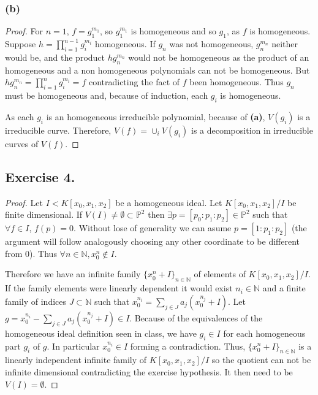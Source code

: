 \documentclass[11pt,a4paper]{article}
\begin{document}
\subsubsection*{(b)}
  \begin{proof}
    For $ n = 1 $, $ f = g_1^{m_1} $, so $ g_1^{m_1} $ is homogeneous and so $ g_1 $, as $ f $ is homogeneous. Suppose $ h = \prod_{i=1}^{n-1} g_i^{m_i} $ homogeneous. If $ g_n $ was not homogeneous, $ g_n^{m_n} $ neither would be, and the product $ h g_n^{m_n} $ would not be homogeneous as the product of an homogeneous and a non homogeneous polynomials can not be homogeneous. But $ h g_n^{m_n} = \prod_{i=1}^n g_i^{m_i} = f $ contradicting the fact of $ f $ been homogeneous. Thus $ g_n $ must be homogeneous and, because of induction, each $ g_i $ is homogeneous.

    \vspace{1mm}
    As each $ g_i $ is an homogeneous irreducible polynomial, because of {\bf (a)}, $ V(g_i) $ is a irreducible curve. Therefore, $ V(f) = \cup_i V(g_i) $ is a decomposition in irreducible curves of $ V(f) $.
  \end{proof}

\subsection*{Exercise 4.}
\begin{proof}
  Let $ I < K[x_0, x_1, x_2] $ be a homogeneous ideal. Let $ K[x_0, x_1, x_2] / I $ be finite dimensional. If $ V(I) \neq \emptyset \subset \mathbb P^2 $ then $ \exists p = [p_0: p_1: p_2] \in \mathbb P^2 $ such that $ \forall f \in I $, $ f(p) = 0 $. Without lose of generality we can asume $ p = [1: p_1: p_2] $ (the argument will follow analogously choosing any other coordinate to be different from $ 0 $). Thus $ \forall n \in \mathbb N, x_0^n \notin I $. 

  \vspace{1mm}
  Therefore we have an infinite family $ \{ x_0^n + I \}_{n \in \mathbb N} $ of elements of $ K[x_0, x_1, x_2] / I $. If the family elements were linearly dependent it would exist $ n_i \in \mathbb N $ and a finite family of indices $ J \subset \mathbb N $ such that $ x_0^{n_i} = \sum_{j \in J} a_j (x_0^{n_j} + I) $. Let $ g = x_0^{n_i} - \sum_{j \in J} a_j (x_0^{n_j} + I) \in I $. Because of the equivalences of the homogeneous ideal definition seen in class, we have $ g_i \in I $ for each homogeneous part $ g_i $ of $ g $. In particular $ x_0^{n_i} \in I $ forming a contradiction. Thus, $ \{ x_0^n + I \}_{n \in \mathbb N} $ is a linearly independent infinite family of $ K[x_0, x_1, x_2] / I $ so the quotient can not be infinite dimensional contradicting the exercise hypothesis. It then need to be $ V(I) = \emptyset $.
\end{proof}
\end{document}
